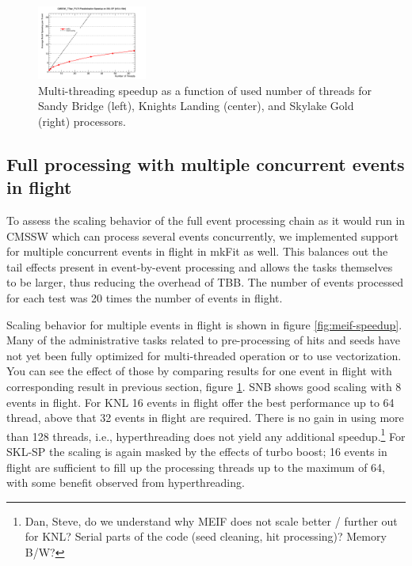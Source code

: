 \documentclass{webofc}
\def\mkfit{mkFit\xspace}
\def\threep{0.32\textwidth}
\def\postfigskip{\vskip-4mm}
\begin{document}
\begin{figure}[htb]
  \includegraphics[width=\threep]{figs/comp/SKL-SP_CMSSW_TTbar_PU70_TH_speedup.png}
  \postfigskip

  \caption{Multi-threading speedup as a function of used number of threads for Sandy
    Bridge (left), Knights Landing (center), and Skylake Gold (right) processors.}
  \label{fig:th-speedup}
\end{figure}


\subsection{Full processing with multiple concurrent events in flight}

To assess the scaling behavior of the full event processing chain as it would
run in CMSSW which can process several events concurrently, we implemented
support for multiple concurrent events in flight in \mkfit as well. This
balances out the tail effects present in event-by-event processing and allows
the tasks themselves to be larger, thus reducing the overhead of TBB. The 
number of events processed for each test was 20 times the number of events in 
flight. 

Scaling behavior for multiple events in flight is shown in figure
\ref{fig:meif-speedup}. Many of the administrative tasks related to
pre-processing of hits and seeds have not yet been fully optimized for
multi-threaded operation or to use vectorization. You can see the effect of
those by comparing results for one event in flight with corresponding result
in previous section, figure \ref{fig:th-speedup}. SNB shows good scaling with
8 events in flight. For KNL 16 events in flight offer the best performance up
to 64 thread, above that 32 events in flight are required. There is no gain in
using more than 128 threads, i.e., hyperthreading does not yield any
additional speedup.\footnote{Dan, Steve, do we understand why MEIF does not
  scale better / further out for KNL? Serial parts of the code (seed cleaning,
  hit processing)? Memory B/W?} For SKL-SP the scaling is again masked by the
effects of turbo boost; 16 events in flight are sufficient to fill up the
processing threads up to the maximum of 64, with some benefit observed from
hyperthreading.
\end{document}
